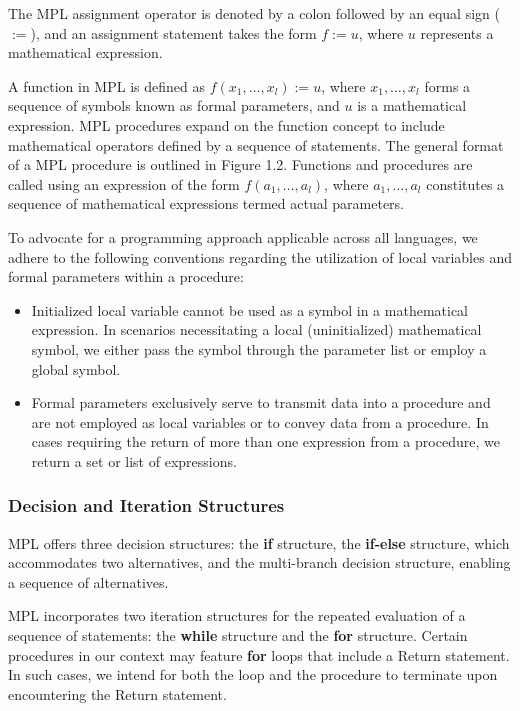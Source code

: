 The \ac{MPL} assignment operator is denoted by a colon followed by an equal sign ($:=$), and an assignment statement takes the form $f:=u$, where $u$ represents a mathematical expression.

A function in \ac{MPL} is defined as $f(x_1, \dots, x_l):=u$, where $x_1, \dots, x_l$ forms a sequence of symbols known as formal parameters, and $u$ is a mathematical expression. \ac{MPL} procedures expand on the function concept to include mathematical operators defined by a sequence of statements. The general format of a \ac{MPL} procedure is outlined in Figure 1.2. Functions and procedures are called using an expression of the form $f(a_1, \dots, a_l) $, where $a_1, \dots, a_l$ constitutes a sequence of mathematical expressions termed actual parameters.

To advocate for a programming approach applicable across all languages, we adhere to the following conventions regarding the utilization of local variables and formal parameters within a procedure:
%
\begin{itemize}
  \setlength{\itemsep}{0.0em}
  \item Initialized local variable cannot be used as a symbol in a mathematical expression. In scenarios necessitating a local (uninitialized) mathematical symbol, we either pass the symbol through the parameter list or employ a global symbol.
  \item Formal parameters exclusively serve to transmit data into a procedure and are not employed as local variables or to convey data from a procedure. In cases requiring the return of more than one expression from a procedure, we return a set or list of expressions.
\end{itemize}

\subsubsection{Decision and Iteration Structures}

\ac{MPL} offers three decision structures: the \textbf{if} structure, the \textbf{if-else} structure, which accommodates two alternatives, and the multi-branch decision structure, enabling a sequence of alternatives.

\ac{MPL} incorporates two iteration structures for the repeated evaluation of a sequence of statements: the \textbf{while} structure and the \textbf{for} structure. Certain procedures in our context may feature \textbf{for} loops that include a Return statement. In such cases, we intend for both the loop and the procedure to terminate upon encountering the Return statement.

